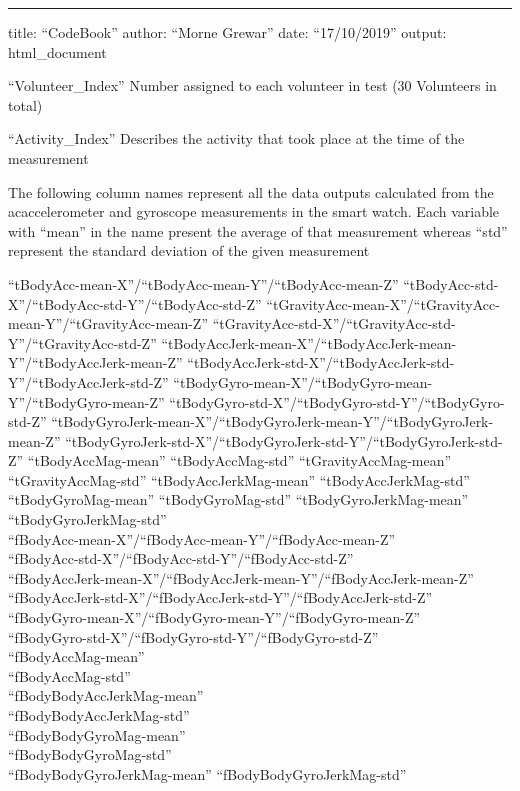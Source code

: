 \documentclass[]{article}
\title{}
\author{}
\date{}
\begin{document}
\begin{center}\rule{0.5\linewidth}{\linethickness}\end{center}

title: ``CodeBook'' author: ``Morne Grewar'' date: ``17/10/2019''
output: html\_document

``Volunteer\_Index'' Number assigned to each volunteer in test (30
Volunteers in total)

``Activity\_Index'' Describes the activity that took place at the time
of the measurement

The following column names represent all the data outputs calculated
from the acaccelerometer and gyroscope measurements in the smart watch.
Each variable with ``mean'' in the name present the average of that
measurement whereas ``std'' represent the standard deviation of the
given measurement

``tBodyAcc-mean-X''/``tBodyAcc-mean-Y''/``tBodyAcc-mean-Z''
``tBodyAcc-std-X''/``tBodyAcc-std-Y''/``tBodyAcc-std-Z''
``tGravityAcc-mean-X''/``tGravityAcc-mean-Y''/``tGravityAcc-mean-Z''
``tGravityAcc-std-X''/``tGravityAcc-std-Y''/``tGravityAcc-std-Z''
``tBodyAccJerk-mean-X''/``tBodyAccJerk-mean-Y''/``tBodyAccJerk-mean-Z''
``tBodyAccJerk-std-X''/``tBodyAccJerk-std-Y''/``tBodyAccJerk-std-Z''
``tBodyGyro-mean-X''/``tBodyGyro-mean-Y''/``tBodyGyro-mean-Z''
``tBodyGyro-std-X''/``tBodyGyro-std-Y''/``tBodyGyro-std-Z''
``tBodyGyroJerk-mean-X''/``tBodyGyroJerk-mean-Y''/``tBodyGyroJerk-mean-Z''
``tBodyGyroJerk-std-X''/``tBodyGyroJerk-std-Y''/``tBodyGyroJerk-std-Z''
``tBodyAccMag-mean'' ``tBodyAccMag-std'' ``tGravityAccMag-mean''\\
``tGravityAccMag-std'' ``tBodyAccJerkMag-mean''
``tBodyAccJerkMag-std''\\
``tBodyGyroMag-mean'' ``tBodyGyroMag-std'' ``tBodyGyroJerkMag-mean''\\
``tBodyGyroJerkMag-std''\\
``fBodyAcc-mean-X''/``fBodyAcc-mean-Y''/``fBodyAcc-mean-Z''\\
``fBodyAcc-std-X''/``fBodyAcc-std-Y''/``fBodyAcc-std-Z''\\
``fBodyAccJerk-mean-X''/``fBodyAccJerk-mean-Y''/``fBodyAccJerk-mean-Z''\\
``fBodyAccJerk-std-X''/``fBodyAccJerk-std-Y''/``fBodyAccJerk-std-Z''\\
``fBodyGyro-mean-X''/``fBodyGyro-mean-Y''/``fBodyGyro-mean-Z''\\
``fBodyGyro-std-X''/``fBodyGyro-std-Y''/``fBodyGyro-std-Z''\\
``fBodyAccMag-mean''\\
``fBodyAccMag-std''\\
``fBodyBodyAccJerkMag-mean''\\
``fBodyBodyAccJerkMag-std''\\
``fBodyBodyGyroMag-mean''\\
``fBodyBodyGyroMag-std''\\
``fBodyBodyGyroJerkMag-mean'' ``fBodyBodyGyroJerkMag-std''
\end{document}
